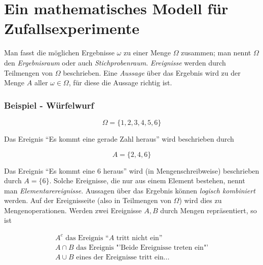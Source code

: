 



\part{Ein mathematisches Modell für Zufallsexperimente}

Man fasst die möglichen Ergebnisse $\omega$ zu einer Menge $\Omega$ zusammen; man nennt $\Omega$ den \textit{Ergebnisraum} oder auch \textit{Stichprobenraum}. \textit{Ereignisse} werden durch Teilmengen von $\Omega$ beschrieben.
Eine \textit{Aussage} über das Ergebnis wird zu der Menge $A$ aller $\omega \in \Omega$, für diese die Aussage richtig ist.

\section{Beispiel - Würfelwurf}

\begin{displaymath}
\Omega = \{1,2,3,4,5,6\}
\end{displaymath}

Das Ereignis ``Es kommt eine gerade Zahl heraus'' wird beschrieben durch

\begin{displaymath}
A = \{2,4,6\}
\end{displaymath}

Das Ereignis ``Es kommt eine 6 heraus'' wird (in Mengenschreibweise) beschrieben durch $A = \{6\}$.
Solche Ereignisse, die nur aus einem Element bestehen, nennt man \textit{Elementarereignisse}.
Aussagen über das Ergebnis können \textit{logisch kombiniert} werden. Auf der Ereignisseite (also in Teilmengen von $\Omega$) wird dies zu Mengenoperationen. Werden zwei Ereignisse $A, B$ durch Mengen repräsentiert, so ist

\begin{eqnarray*}
A^c \text{ das Ereignis ``$A$ tritt nicht ein''}\\
A \cap B \text{ das Ereignis "'Beide Ereignisse treten ein"'}\\
A \cup B \text{ eines der Ereignisse tritt ein}
\ldots
\end{eqnarray*}

